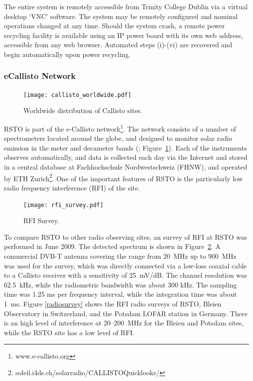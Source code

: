 The entire system is remotely accessible from Trinity College Dublin via a virtual desktop `VNC' software. The system may be remotely configured and nominal operations changed at any time. Should the system crash, a remote power recycling facility is available using an IP power board with its own web address, accessible from any web browser. Automated steps (i)-(vi) are recovered and begin automatically upon power recycling.

\subsubsection{eCallisto Network}
\begin{figure}[!t]
\begin{center}
\texttt{[image: callisto\_worldwide.pdf]}
\caption[Callisto Worlwide]{Worldwide distribution of Callisto sites.}
\label{fig:callisto_worldwide}
\end{center}
\end{figure}
RSTO is part of the e-Callisto network\footnote{www.e-callisto.org}. The network consists of a number of spectrometers located around the globe, and designed to monitor solar radio emission in the meter and decameter bands (\citealt{Benz2009}; Figure~\ref{fig:callisto_worldwide}).  Each of the instruments observes automatically, and data is collected each day via the Internet and stored in a central database at Fachhochschule Nordwestschweiz (FHNW), and operated by ETH Zurich\footnote{soleil.i4ds.ch/solarradio/CALLISTOQuicklooks/}. One of the important features of RSTO is the particularly low radio frequency interference (RFI) of the site. 
\begin{figure}[!t]
\begin{center}
\texttt{[image: rfi\_survey.pdf]}
\caption[RSTO RFI Survey]{RFI Survey.}
\label{fig:rfi_survey}
\end{center}
\end{figure}

To compare RSTO to other radio observing sites, an survey of RFI at RSTO was performed in June 2009. The detected spectrum is shown in Figure~\ref{fig:rfi_survey}.  A commercial DVB-T antenna covering the range from 20~MHz up to 900~MHz was used for the survey, which was directly connected via a low-loss coaxial cable to a Callisto receiver with a sensitivity of 25~mV/dB. The channel resolution was 62.5~kHz, while the radiometric bandwidth was about 300 kHz. The sampling time was 1.25 ms per frequency interval, while the integration time was about 1~ms.  Figure \ref{radiosurvey} shows the RFI radio surveys of RSTO, Bleien Observatory in Switzerland, and the Potsdam LOFAR station in Germany. There is an high level of interference at 20--200~MHz for the Bleien and Potsdam sites, while the RSTO site has a low level of RFI.



